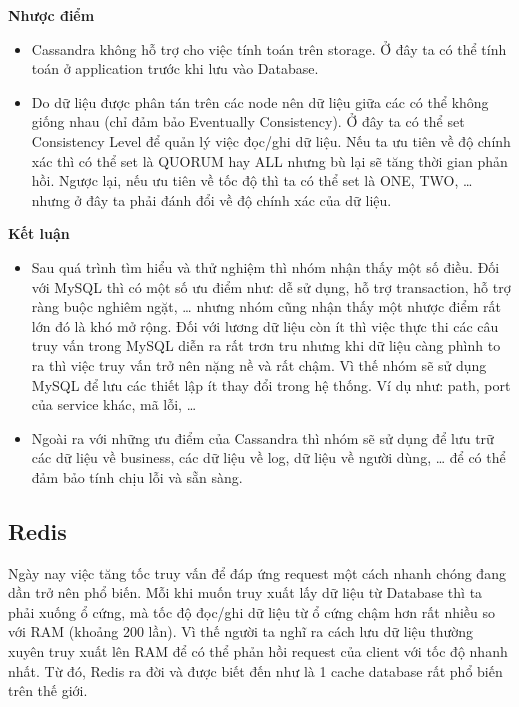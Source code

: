             \textbf{Nhược điểm}
            
            \begin{itemize}
                \item Cassandra không hỗ trợ cho việc tính toán trên storage. Ở đây ta có thể tính toán ở application trước khi lưu vào Database.
                \item Do dữ liệu được phân tán trên các node nên dữ liệu giữa các có thể không giống nhau (chỉ đảm bảo Eventually Consistency). Ở đây ta có thể set Consistency Level để quản lý việc đọc/ghi dữ liệu. Nếu ta ưu tiên về độ chính xác thì có thể set là QUORUM hay ALL nhưng bù lại sẽ tăng thời gian phản hồi. Ngược lại, nếu ưu tiên về tốc độ thì ta có thể set là ONE, TWO, … nhưng ở đây ta phải đánh đổi về độ chính xác của dữ liệu.
            \end{itemize}
            
            \textbf{Kết luận}
            
            \begin{itemize}
                \item Sau quá trình tìm hiểu và thử nghiệm thì nhóm nhận thấy một số điều. Đối với MySQL thì có một số ưu điểm như: dễ sử dụng, hỗ trợ transaction, hỗ trợ ràng buộc nghiêm ngặt, … nhưng nhóm cũng nhận thấy một nhược điểm rất lớn đó là khó mở rộng. Đối với lương dữ liệu còn ít thì việc thực thi các câu truy vấn trong MySQL diễn ra rất trơn tru nhưng khi dữ liệu càng phình to ra thì việc truy vấn trở nên nặng nề và rất chậm. Vì thế nhóm sẽ sử dụng MySQL để lưu các thiết lập ít thay đổi trong hệ thống. Ví dụ như: path, port của service khác, mã lỗi, …
                \item Ngoài ra với những ưu điểm của Cassandra thì nhóm sẽ sử dụng để lưu trữ các dữ liệu về business, các dữ liệu về log, dữ liệu về người dùng, … để có thể đảm bảo tính chịu lỗi và sẵn sàng.
            \end{itemize}
            \subsection{Redis}
            
            Ngày nay việc tăng tốc truy vấn để đáp ứng request một cách nhanh chóng đang dần trở nên phổ biến. Mỗi khi muốn truy xuất lấy dữ liệu từ Database thì ta phải xuống ổ cứng, mà tốc độ đọc/ghi dữ liệu từ ổ cứng chậm hơn rất nhiều so với RAM (khoảng 200 lần). Vì thế người ta nghĩ ra cách lưu dữ liệu thường xuyên truy xuất lên RAM để có thể phản hồi request của client với tốc độ nhanh nhất. Từ đó, Redis ra đời và được biết đến như là 1 cache database rất phổ biến trên thế giới.\\
            
